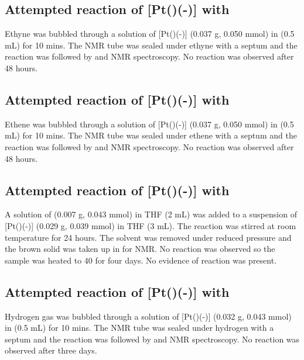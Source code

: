 \subsection*{Attempted reaction of \texorpdfstring{[Pt(\tButhixantphos)(-)]} P with \texorpdfstring{} C}

Ethyne was bubbled through a solution of [Pt(\tButhixantphos)(-)] (0.037 g, 0.050 mmol) in  (0.5 mL) for 10 mins.  The NMR tube was sealed under ethyne with a septum and the reaction was followed by \proton{} and \phosphorus{} NMR spectroscopy.  No reaction was observed after 48 hours.

\subsection*{Attempted reaction of \texorpdfstring{[Pt(\tButhixantphos)(-)]} P with \texorpdfstring{} C}

Ethene was bubbled through a solution of [Pt(\tButhixantphos)(-)] (0.037 g, 0.050 mmol) in  (0.5 mL) for 10 mins.  The NMR tube was sealed under ethene with a septum and the reaction was followed by \proton{} and \phosphorus{} NMR spectroscopy.  No reaction was observed after 48 hours.

\subsection*{Attempted reaction of \texorpdfstring{[Pt(\tButhixantphos)(-)]} P with \texorpdfstring{} N}

A solution of  (0.007 g, 0.043 mmol) in THF (2 mL) was added to a suspension of  [Pt(\tButhixantphos)(-)] (0.029 g, 0.039 mmol) in THF (3 mL).  The reaction was stirred at room temperature for 24 hours.  The solvent was removed under reduced pressure and the brown solid was taken up in  for NMR.  No reaction was observed so the sample was heated to 40 \degC{} for four days.  No evidence of reaction was present.  

\subsection*{Attempted reaction of \texorpdfstring{[Pt(\tButhixantphos)(-)]} P with \texorpdfstring{} H}

Hydrogen gas was bubbled through a solution of [Pt(\tButhixantphos)(-)] (0.032 g, 0.043 mmol) in  (0.5 mL) for 10 mins.  The NMR tube was sealed under hydrogen with a septum and the reaction was followed by \proton{} and \phosphorus{} NMR spectroscopy.  No reaction was observed after three days.  

